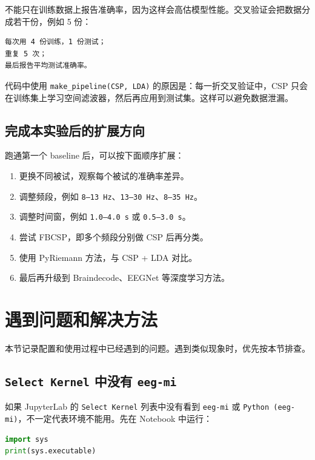 \documentclass[UTF8,a4paper,12pt]{ctexart}
\begin{document}
不能只在训练数据上报告准确率，因为这样会高估模型性能。交叉验证会把数据分成若干份，例如 5 份：

\begin{lstlisting}[language={}]
每次用 4 份训练，1 份测试；
重复 5 次；
最后报告平均测试准确率。
\end{lstlisting}

代码中使用 \texttt{make\_pipeline(CSP, LDA)} 的原因是：每一折交叉验证中，CSP 只会在训练集上学习空间滤波器，然后再应用到测试集。这样可以避免数据泄漏。

\subsection{完成本实验后的扩展方向}

跑通第一个 baseline 后，可以按下面顺序扩展：

\begin{enumerate}[label=\arabic*.]
  \item 更换不同被试，观察每个被试的准确率差异。
  \item 调整频段，例如 \texttt{8--13 Hz}、\texttt{13--30 Hz}、\texttt{8--35 Hz}。
  \item 调整时间窗，例如 \texttt{1.0--4.0 s} 或 \texttt{0.5--3.0 s}。
  \item 尝试 FBCSP，即多个频段分别做 CSP 后再分类。
  \item 使用 PyRiemann 方法，与 CSP + LDA 对比。
  \item 最后再升级到 Braindecode、EEGNet 等深度学习方法。
\end{enumerate}

\section{遇到问题和解决方法}

本节记录配置和使用过程中已经遇到的问题。遇到类似现象时，优先按本节排查。

\subsection{\texttt{Select Kernel} 中没有 \texttt{eeg-mi}}

如果 JupyterLab 的 \texttt{Select Kernel} 列表中没有看到 \texttt{eeg-mi} 或 \texttt{Python (eeg-mi)}，不一定代表环境不能用。先在 Notebook 中运行：

\begin{lstlisting}[language=Python,caption={确认当前 Notebook 使用的 Python 解释器}]
import sys
print(sys.executable)
\end{lstlisting}
\end{document}
